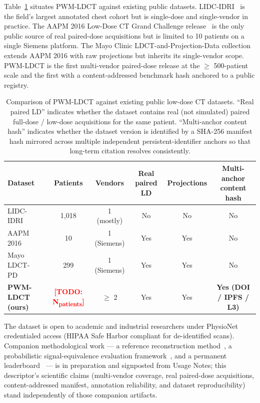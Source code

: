 \documentclass[twoside,11pt]{article}
\newcommand{\todo}[1]{\textcolor{red}{\textbf{[TODO: #1]}}}
\newcommand{\Npatients}{\todo{N\textsubscript{patients}}}
\begin{document}
Table~\ref{tab:dataset_comparison} situates PWM-LDCT against existing public datasets. LIDC-IDRI~\citep{lidc_idri} is the field's largest annotated chest cohort but is single-dose and single-vendor in practice. The AAPM 2016 Low-Dose CT Grand Challenge release~\citep{aapm2016challenge} is the only public source of real paired-dose acquisitions but is limited to 10 patients on a single Siemens platform. The Mayo Clinic LDCT-and-Projection-Data collection~\citep{mccollough2020mayo} extends AAPM 2016 with raw projections but inherits its single-vendor scope. PWM-LDCT is the first multi-vendor paired-dose release at the $\geq$ 500-patient scale and the first with a content-addressed benchmark hash anchored to a public registry.

\begin{table}[ht]
    \centering
    \small
    \setlength{\tabcolsep}{4pt}
    \begin{tabular}{lccccc}
        \toprule
        \textbf{Dataset} & \textbf{Patients} & \textbf{Vendors} & \textbf{Real paired LD} & \textbf{Projections} & \textbf{Multi-anchor content hash} \\
        \midrule
        LIDC-IDRI~\citep{lidc_idri}       & 1{,}018 & 1 (mostly)    & No  & No   & No \\
        AAPM 2016~\citep{aapm2016challenge} & 10      & 1 (Siemens)   & Yes & Yes  & No \\
        Mayo LDCT-PD~\citep{mccollough2020mayo} & 299  & 1 (Siemens)   & Yes & Yes  & No \\
        \textbf{PWM-LDCT (ours)}              & \Npatients & $\geq$ 2 & Yes & Yes  & \textbf{Yes (DOI / IPFS / L3)} \\
        \bottomrule
    \end{tabular}
    \caption{Comparison of PWM-LDCT against existing public low-dose CT datasets. ``Real paired LD'' indicates whether the dataset contains real (not simulated) paired full-dose / low-dose acquisitions for the same patient. ``Multi-anchor content hash'' indicates whether the dataset version is identified by a SHA-256 manifest hash mirrored across multiple independent persistent-identifier anchors so that long-term citation resolves consistently.}
    \label{tab:dataset_comparison}
\end{table}

The dataset is open to academic and industrial researchers under PhysioNet credentialed access (HIPAA Safe Harbor compliant for de-identified scans). Companion methodological work --- a reference reconstruction method~\citep{ws3reference}, a probabilistic signal-equivalence evaluation framework~\citep{ws2framework}, and a permanent leaderboard~\citep{ws4leaderboard} --- is in preparation and signposted from Usage Notes; this descriptor's scientific claims (multi-vendor coverage, real paired-dose acquisitions, content-addressed manifest, annotation reliability, and dataset reproducibility) stand independently of those companion artifacts.
\end{document}
